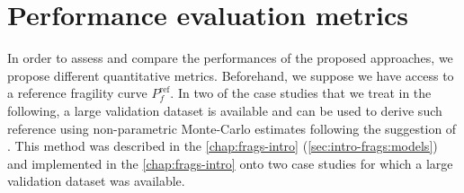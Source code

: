 







\section{Performance evaluation metrics}\label{sec:PREM:metrics}

In order to assess and compare the performances of the proposed approaches, we propose different quantitative metrics.
Beforehand, we suppose we have access to a reference fragility curve $P^{\text{ref}}_f$. In two of the case studies that we treat in the following, a large validation dataset is available and can be used to derive such reference using non-parametric Monte-Carlo estimates following the suggestion of \citet{trevlopoulos_parametric_2019}. This method was described in the \cref{chap:frags-intro} (\cref{sec:intro-frags:models}) and implemented in the \cref{chap:frags-intro} onto two case studies for which a large validation dataset was available.

